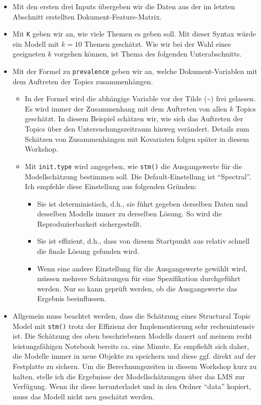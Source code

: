 \documentclass[
]{book}
\providecommand{\tightlist}{%
  \setlength{\itemsep}{0pt}\setlength{\parskip}{0pt}}
\begin{document}
\begin{itemize}
\tightlist
\item
  Mit den ersten drei Inputs übergeben wir die Daten aus der im letzten Abschnitt erstellten Dokument-Feature-Matrix.
\item
  Mit \texttt{K} geben wir an, wie viele Themen es geben soll. Mit dieser Syntax würde ein Modell mit \(k = 10\) Themen geschätzt. Wie wir bei der Wahl eines geeigneten \(k\) vorgehen können, ist Thema des folgenden Unterabschnitts.
\item
  Mit der Formel zu \texttt{prevalence} geben wir an, welche Dokument-Variablen mit dem Auftreten der Topics zusammenhängen.

  \begin{itemize}
  \tightlist
  \item
    In der Formel wird die abhängige Variable vor der Tilde (\textasciitilde) frei gelassen. Es wird immer der Zusammenhang mit dem Auftreten von allen \(k\) Topics geschätzt. In diesem Beispiel schätzen wir, wie sich das Auftreten der Topics über den Untersuchungszeitraum hinweg verändert. Details zum Schätzen von Zusammenhängen mit Kovariaten folgen später in diesem Workshop.
  \item
    Mit \texttt{init.type} wird angegeben, wie \texttt{stm()} die Ausgangswerte für die Modellschätzung bestimmen soll. Die Default-Einstellung ist ``Spectral''. Ich empfehle diese Einstellung aus folgenden Gründen:

    \begin{itemize}
    \tightlist
    \item
      Sie ist deterministisch, d.h., sie führt gegeben derselben Daten und desselben Modells immer zu derselben Lösung. So wird die Reproduzierbarkeit sichergestellt.
    \item
      Sie ist effizient, d.h., dass von diesem Startpunkt aus relativ schnell die finale Lösung gefunden wird.
    \item
      Wenn eine andere Einstellung für die Ausgangswerte gewählt wird, müssen mehrere Schätzungen für eine Spezifikation durchgeführt werden. Nur so kann geprüft werden, ob die Ausgangswerte das Ergebnis beeinflussen.
    \end{itemize}
  \end{itemize}
\item
  Allgemein muss beachtet werden, dass die Schätzung eines Structural Topic Model mit \texttt{stm()} trotz der Effizienz der Implementierung sehr rechenintensiv ist. Die Schätzung des oben beschriebenen Modells dauert auf meinem recht leistungsfähigen Notebook bereits ca. eine Minute. Es empfiehlt sich daher, die Modelle immer in neue Objekte zu speichern und diese ggf. direkt auf der Festplatte zu sichern. Um die Berechnungszeiten in diesem Workshop kurz zu halten, stelle ich die Ergebnisse der Modellschätzungen über das LMS zur Verfügung. Wenn ihr diese herunterladet und in den Ordner ``data'' kopiert, muss das Modell nicht neu geschätzt werden.
\end{itemize}
\end{document}
